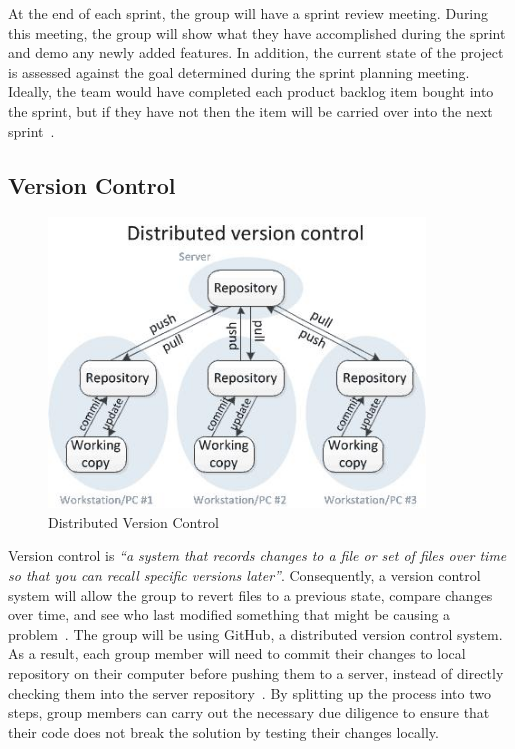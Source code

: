 At the end of each sprint, the group will have a sprint review meeting. During this meeting, the group will show what they have accomplished during the sprint and demo any newly added features. In addition, the current state of the project is assessed against the goal determined during the sprint planning meeting. Ideally, the team would have completed each product backlog item bought into the sprint, but if they have not then the item will be carried over into the next sprint~\parencite{web:scrum_sprint}.

\subsection{Version Control}

\begin{figure}
  \centering
  \begin{minipage}{10cm}
    \centering
    \includegraphics[width=10cm]{inc/distributed_version_control.jpg}
    \caption{Distributed Version Control}
    \label{fig:distributed_version_control}
  \end{minipage}
\end{figure}

Version control is \emph{``a system that records changes to a file or set of files over time so that you can recall specific versions later''}. Consequently, a version control system will allow the group to revert files to a previous state, compare changes over time, and see who last modified something that might be causing a problem~\parencite{web:git}. The group will be using GitHub, a distributed version control system. As a result, each group member will need to commit their changes to local repository on their computer before pushing them to a server, instead of directly checking them into the server repository~\parencite{book:pro_tfs}. By splitting up the process into two steps, group members can carry out the necessary due diligence to ensure that their code does not break the solution by testing their changes locally.


